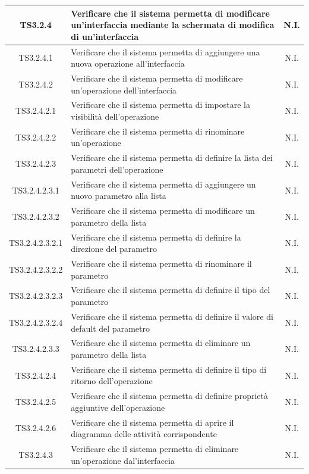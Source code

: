 \documentclass[../PianoDiQualifica.tex]{subfiles}
\begin{document}
\begin{longtable}{|c|>{\centering}p{10cm}|c|}
	\hline
	TS3.2.4 & Verificare che il sistema permetta di modificare un'interfaccia mediante la schermata di modifica di un'interfaccia & N.I. \\
	\hline
	TS3.2.4.1 & Verificare che il sistema permetta di aggiungere una nuova operazione all'interfaccia & N.I. \\
	\hline
	TS3.2.4.2 & Verificare che il sistema permetta di modificare un'operazione dell'interfaccia & N.I. \\
	\hline
	TS3.2.4.2.1 & Verificare che il sistema permetta di impostare la visibilità dell'operazione & N.I. \\
	\hline
	TS3.2.4.2.2 & Verificare che il sistema permetta di rinominare un'operazione & N.I. \\
	\hline
	TS3.2.4.2.3 & Verificare che il sistema permetta di definire la lista dei parametri dell'operazione & N.I. \\
	\hline
	TS3.2.4.2.3.1 & Verificare che il sistema permetta di aggiungere un nuovo parametro alla lista & N.I. \\
	\hline
	TS3.2.4.2.3.2 & Verificare che il sistema permetta di modificare un parametro della lista & N.I. \\
	\hline
	TS3.2.4.2.3.2.1 & Verificare che il sistema permetta di definire la direzione del parametro & N.I. \\
	\hline
	TS3.2.4.2.3.2.2 & Verificare che il sistema permetta di rinominare il parametro & N.I. \\
	\hline
	TS3.2.4.2.3.2.3 & Verificare che il sistema permetta di definire il tipo del parametro & N.I. \\
	\hline
	TS3.2.4.2.3.2.4 & Verificare che il sistema permetta di definire il valore di default del parametro & N.I. \\
	\hline
	TS3.2.4.2.3.3 & Verificare che il sistema permetta di eliminare un parametro della lista & N.I. \\
	\hline
	TS3.2.4.2.4 & Verificare che il sistema permetta di definire il tipo di ritorno dell'operazione & N.I. \\
	\hline
	TS3.2.4.2.5 & Verificare che il sistema permetta di definire proprietà aggiuntive dell'operazione & N.I. \\
	\hline
	TS3.2.4.2.6 & Verificare che il sistema permetta di aprire il diagramma delle attività corrispondente & N.I. \\
	\hline
	TS3.2.4.3 & Verificare che il sistema permetta di eliminare un'operazione dal'interfaccia & N.I. \\

\end{longtable}
\end{document}
